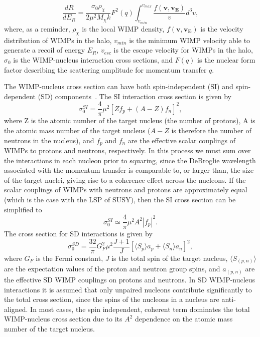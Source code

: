 \begin{equation} \label{final_dRdER_2}
\frac{dR}{dE_R}=\frac{\sigma_0 \rho_\chi}{2 \mu^2 M_\chi k} F^2(q)  \int_{v_{min}}^{v_{max}} \frac{f(\mathbf{v},\mathbf{v_E})}{v} d^3v, 
\end{equation}
where, as a reminder, $\rho_\chi$ is the local WIMP density, $f(\mathbf{v},\mathbf{v_E})$ is the velocity distribution of WIMPs in the halo, $v_{min}$ is the minimum WIMP velocity able to generate a recoil of energy $E_R$, $v_{esc}$ is the escape velocity for WIMPs in the halo, $\sigma_0$ is the WIMP-nucleus interaction cross sections, and $F(q)$ is the nuclear form factor describing the scattering amplitude for momentum transfer $q$.

The WIMP-nucleus cross section can have both spin-independent (SI) and spin-dependent (SD) components~\cite{Shan}. The SI interaction cross section is given by
\[\sigma_0^{SI}=\frac{4}{\pi}\mu^2 \left[Z f_p + (A - Z) f_n \right]^2,\]
where Z is the atomic number of the target nucleus (the number of protons), A is the atomic mass number of the target nucleus ($A-Z$ is therefore the number of neutrons in the nucleus), and $f_p$ and $f_n$ are the effective scalar couplings of WIMPs to protons and neutrons, respectively.  In this process we must sum over the interactions in each nucleon prior to squaring, since the DeBroglie wavelength associated with the momentum transfer is comparable to, or larger than, the size of the target nuclei, giving rise to a coherence effect across the nucleons.  If the scalar couplings of WIMPs with neutrons and protons are approximately equal (which is the case with the LSP of SUSY), then the SI cross section can be simplified to
\[\sigma_0^{SI} \simeq \frac{4}{\pi}\mu^2 A^2 |f_p|^2. \]
The cross section for SD interactions is given by
\[\sigma_0^{SD}=\frac{32}{\pi}G_F^2\mu^2\frac{J+1}{J} \left[\langle S_p \rangle a_p + \langle S_n \rangle a_n \right]^2, \]
where $G_F$ is the Fermi constant, $J$ is the total spin of the target nucleus, $\langle S_{(p,n)} \rangle$ are the expectation values of the proton and neutron group spins, and $a_{(p,n)}$ are the effective SD WIMP couplings on protons and neutrons.  In SD WIMP-nucleus interactions it is assumed that only unpaired nucleons contribute significantly to the total cross section, since the spins of the nucleons in a nucleus are anti-aligned.  In most cases, the spin independent, coherent term dominates the total WIMP-nucleus cross section due to its $A^2$ dependence on the atomic mass number of the target nucleus.  

